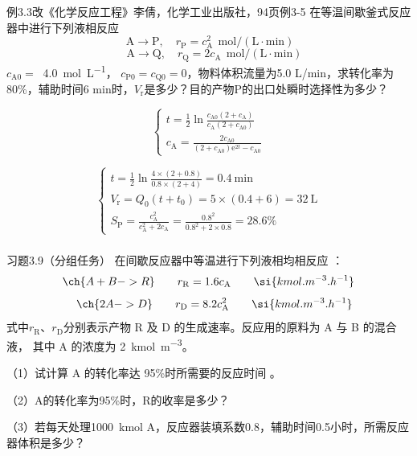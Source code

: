 \documentclass[dvipsnames, svgnames, x11names]{beamer}
\begin{document}
\begin{frame}[t]{}
    \begin{block}{例3.3改\quad \scriptsize{《化学反应工程》李倩，化学工业出版社，94页例3-5}}
        在等温间歇釜式反应器中进行下列液相反应
        \[
            \mathrm{~A} \longrightarrow \mathrm{P}, \quad r_{\mathrm{P}}= c_{\mathrm{A}}^{2} ~~\mathrm{mol} /(\mathrm{L} \cdot \mathrm{min})
        \]
        \[
            \quad \mathrm{A} \longrightarrow \mathrm{Q}, \quad r_{\mathrm{Q}}=2 c_{\mathrm{A}}~~ \mathrm{mol} /(\mathrm{L} \cdot \mathrm{min})
        \]
        $c_{\mathrm{A0}} = \ $ \SI{4.0}{mol.L^{-1}}， $c_{\mathrm{P0}} = c_{\mathrm{Q0}} = 0$，物料体积流量为5.0 L/min，求转化率为80\%，辅助时间6 min时，$V_\mathrm{r}$是多少？目的产物P的出口处瞬时选择性为多少？
        \tcblower
        \begin{minipage}{0.38\linewidth}
            \[
            \begin{cases}
            t = \frac{1}{2}\ln \frac{c_{\mathrm{A0}}(2+c_{\mathrm{A}})}{c_{\mathrm{A}}(2+c_{\mathrm{A0}})}\\
            c_{\mathrm{A}} = \frac{2c_{\mathrm{A0}}}{(2+c_{\mathrm{A0}})\mathrm{e}^{2t}-c_{\mathrm{A0}}}
            \end{cases}
            \]
        \end{minipage}\hfill
        \begin{minipage}{0.58\linewidth}
            \pause
            \[
            \begin{cases}
            t = \frac{1}{2}\ln \frac{4\times (2+0.8)}{0.8\times (2+4)} = 0.4 \ \mathrm{min}\\
            V_\mathrm{r} = Q_0(t + t_0) = 5\times (0.4 + 6) = 32 \ \mathrm{L}\\
            S_{\mathrm{P}} = \frac{c_{\mathrm{A}}^2}{c_{\mathrm{A}}^2+2c_{\mathrm{A}}} = \frac{0.8^2}{0.8^2+2\times 0.8} = 28.6\%
            \end{cases}
            \]
        \end{minipage}
    \end{block}
\end{frame}


\begin{frame}[t]
    \frametitle{}
    \begin{redblock}{习题3.9（分组任务）}
        在间歇反应器中等温进行下列液相均相反应 ：
        \[
            \ch{A + B -> R} \qquad r_\mathrm{R} = 1.6 c_\mathrm{A} \qquad \si{kmol.m^{-3}.h^{-1}}
        \]
        \[
            \quad \ch{2 A -> D}  \qquad r_\mathrm{D} = 8.2 c_\mathrm{A}^2 \qquad \si{kmol.m^{-3}.h^{-1}}
        \]
        式中$r_\mathrm{R}$、$r_\mathrm{D}$分别表示产物 R 及 D 的生成速率。反应用的原料为 A 与 B 的混合液， 其中 A 的浓度为 \SI{2}{kmol.m^{-3}}。
        
        （1）试计算 A 的转化率达 95\%时所需要的反应时间 。

        （2）A的转化率为95\%时，R的收率是多少？

        （3）若每天处理1000\ kmol A，反应器装填系数0.8，辅助时间0.5小时，所需反应器体积是多少？
    \end{redblock}
\end{frame}
\end{document}
